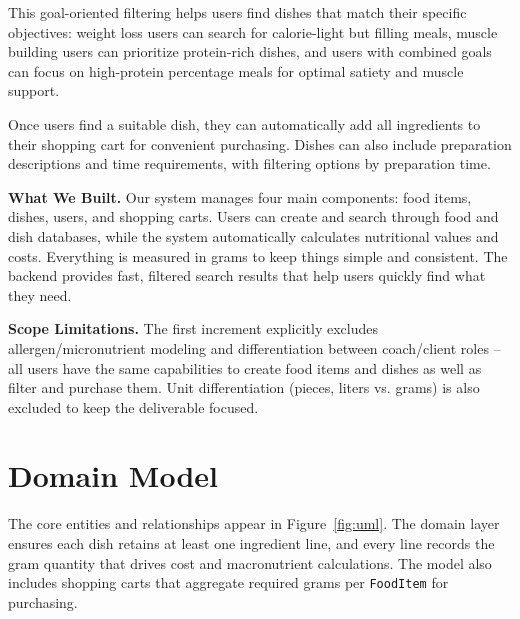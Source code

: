 \documentclass[11pt]{article}
\begin{document}
This goal-oriented filtering helps users find dishes that match their specific objectives: weight loss users can search for calorie-light but filling meals, muscle building users can prioritize protein-rich dishes, and users with combined goals can focus on high-protein percentage meals for optimal satiety and muscle support.

Once users find a suitable dish, they can automatically add all ingredients to their shopping cart for convenient purchasing. Dishes can also include preparation descriptions and time requirements, with filtering options by preparation time.

\textbf{What We Built.} Our system manages four main components: food items, dishes, users, and shopping carts. Users can create and search through food and dish databases, while the system automatically calculates nutritional values and costs. Everything is measured in grams to keep things simple and consistent. The backend provides fast, filtered search results that help users quickly find what they need.

\textbf{Scope Limitations.} The first increment explicitly excludes allergen/micronutrient modeling and differentiation between coach/client roles – all users have the same capabilities to create food items and dishes as well as filter and purchase them. Unit differentiation (pieces, liters vs. grams) is also excluded to keep the deliverable focused.

\section{Domain Model}

The core entities and relationships appear in Figure~\ref{fig:uml}. The domain layer ensures each dish retains at least one ingredient line, and every line records the gram quantity that drives cost and macronutrient calculations. The model also includes shopping carts that aggregate required grams per \texttt{FoodItem} for purchasing.
\end{document}
